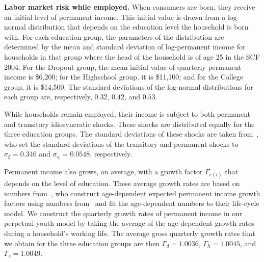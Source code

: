 \documentclass[\PathToRoot/\ProjectName]{subfiles}
\begin{document}

\textbf{Labor market risk while employed.} When consumers are born, they receive an initial level of permanent income.
This initial value is drawn from a log-normal distribution that depends on the education level the household is born with.
For each education group, the parameters of the distribution are determined by the mean and standard deviation of log-permanent income for households in that group where the head of the household is of age 25 in the SCF 2004.
For the Dropout group, the mean initial value of quarterly permanent income is \$6,200; for the Highschool group, it is \$11,100; and for the College group, it is \$14,500.
The standard deviations of the log-normal distributions for each group are, respectively, $0.32$, $0.42$, and $0.53$.

While households remain employed, their income is subject to both permanent and transitory idiosyncratic shocks.
These shocks are distributed equally for the three education groups.
The standard deviations of these shocks are taken from~\cite{carroll2020sticky}, who set the standard deviations of the transitory and permanent shocks to $\sigma_\xi=0.346$ and $\sigma_\psi=0.0548$, respectively.

Permanent income also grows, on average, with a growth factor $\Gamma_{e(i)}$ that depends on the level of education.
These average growth rates are based on numbers from~\cite{carroll2020modeling}, who construct age-dependent expected permanent income growth factors using numbers from~\cite{cagetti2003wealth} and fit the age-dependent numbers to their life-cycle model.
We construct the quarterly growth rates of permanent income in our perpetual-youth model by taking the average of the age-dependent growth rates during a household's working life.
The average gross quarterly growth rates that we obtain for the three education groups are then $\Gamma_d=1.0036$, $\Gamma_h=1.0045$, and $\Gamma_c=1.0049$.
\end{document}
